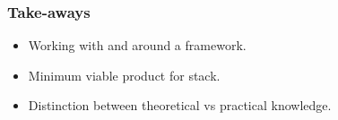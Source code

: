 \documentclass[17pt]{beamer}
\begin{document}
	
	\begin{frame}
		\frametitle{Take-aways}
		\begin{itemize}
		\item Working with and around a framework.
		\item Minimum viable product for stack.
		\item Distinction between theoretical vs practical knowledge.
		\end{itemize}
	
		
	\end{frame}
\end{document}
